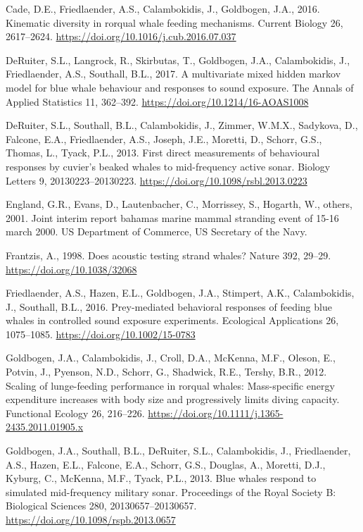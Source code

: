 \documentclass[]{elsarticle} %
\begin{document}
\hypertarget{refs}{}
\hypertarget{ref-cade_kinematic_2016}{}
Cade, D.E., Friedlaender, A.S., Calambokidis, J., Goldbogen, J.A., 2016.
Kinematic diversity in rorqual whale feeding mechanisms. Current Biology
26, 2617--2624. \url{https://doi.org/10.1016/j.cub.2016.07.037}

\hypertarget{ref-deruiter_multivariate_2017}{}
DeRuiter, S.L., Langrock, R., Skirbutas, T., Goldbogen, J.A.,
Calambokidis, J., Friedlaender, A.S., Southall, B.L., 2017. A
multivariate mixed hidden markov model for blue whale behaviour and
responses to sound exposure. The Annals of Applied Statistics 11,
362--392. \url{https://doi.org/10.1214/16-AOAS1008}

\hypertarget{ref-deruiter_first_2013}{}
DeRuiter, S.L., Southall, B.L., Calambokidis, J., Zimmer, W.M.X.,
Sadykova, D., Falcone, E.A., Friedlaender, A.S., Joseph, J.E., Moretti,
D., Schorr, G.S., Thomas, L., Tyack, P.L., 2013. First direct
measurements of behavioural responses by cuvier's beaked whales to
mid-frequency active sonar. Biology Letters 9, 20130223--20130223.
\url{https://doi.org/10.1098/rsbl.2013.0223}

\hypertarget{ref-england_joint_2001}{}
England, G.R., Evans, D., Lautenbacher, C., Morrissey, S., Hogarth, W.,
others, 2001. Joint interim report bahamas marine mammal stranding event
of 15-16 march 2000. US Department of Commerce, US Secretary of the
Navy.

\hypertarget{ref-frantzis_does_1998}{}
Frantzis, A., 1998. Does acoustic testing strand whales? Nature 392,
29--29. \url{https://doi.org/10.1038/32068}

\hypertarget{ref-friedlaender_prey-mediated_2016}{}
Friedlaender, A.S., Hazen, E.L., Goldbogen, J.A., Stimpert, A.K.,
Calambokidis, J., Southall, B.L., 2016. Prey-mediated behavioral
responses of feeding blue whales in controlled sound exposure
experiments. Ecological Applications 26, 1075--1085.
\url{https://doi.org/10.1002/15-0783}

\hypertarget{ref-goldbogen_scaling_2012}{}
Goldbogen, J.A., Calambokidis, J., Croll, D.A., McKenna, M.F., Oleson,
E., Potvin, J., Pyenson, N.D., Schorr, G., Shadwick, R.E., Tershy, B.R.,
2012. Scaling of lunge-feeding performance in rorqual whales:
Mass-specific energy expenditure increases with body size and
progressively limits diving capacity. Functional Ecology 26, 216--226.
\url{https://doi.org/10.1111/j.1365-2435.2011.01905.x}

\hypertarget{ref-goldbogen_blue_2013}{}
Goldbogen, J.A., Southall, B.L., DeRuiter, S.L., Calambokidis, J.,
Friedlaender, A.S., Hazen, E.L., Falcone, E.A., Schorr, G.S., Douglas,
A., Moretti, D.J., Kyburg, C., McKenna, M.F., Tyack, P.L., 2013. Blue
whales respond to simulated mid-frequency military sonar. Proceedings of
the Royal Society B: Biological Sciences 280, 20130657--20130657.
\url{https://doi.org/10.1098/rspb.2013.0657}
\end{document}
